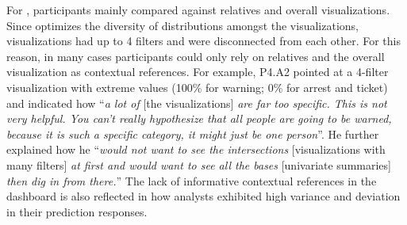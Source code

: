 For \cluster, participants mainly compared
against relatives and overall visualizations.
Since \cluster optimizes the diversity of distributions
amongst the  visualizations,
 visualizations had up to 4 filters
and were disconnected from each other.
For this reason, in many cases\change{,}
participants could only rely on relatives
and the overall visualization as contextual references.
For example, P4.A2 pointed at a 4-filter visualization
with extreme values (100\% for warning; 0\% for arrest and ticket)
and indicated how ``\textit{a lot of} [the visualizations]
\textit{are far too specific. This is not very helpful.
You can't really hypothesize that all people are} \change{[sic]}
\textit{going to be warned, because it is such a specific category,
it might just be one person}''. %
He further explained how he ``\textit{would not want to see the intersections} [visualizations with many filters] \textit{at first and would want to see all the bases} [univariate summaries] \textit{then dig in from there.}'' The lack of informative contextual references in the \cluster dashboard is also reflected in how analysts exhibited high variance and deviation in their prediction responses. %

